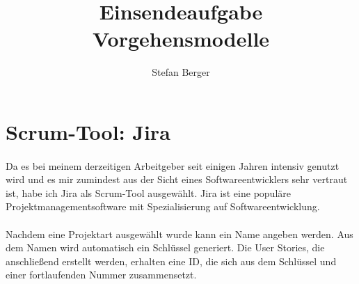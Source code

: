\documentclass{article}
\begin{document}
\title{\Large Einsendeaufgabe \\ Vorgehensmodelle}
\author{\normalsize Stefan Berger}
\date{}
\maketitle

\vspace{160px}

\pagebreak

\section{Scrum-Tool: Jira}
\paragraph{}
Da es bei meinem derzeitigen Arbeitgeber seit einigen Jahren intensiv genutzt wird und es mir zumindest aus der Sicht eines Softwareentwicklers sehr vertraut ist, habe ich Jira  als Scrum-Tool ausgewählt. Jira ist eine populäre Projektmanagementsoftware mit Spezialisierung auf Softwareentwicklung.

\begin{figure}[h]
  \centering
  \label{assistent}
\end{figure}

\paragraph{}
Nachdem eine Projektart ausgewählt wurde kann ein Name angeben werden. Aus dem Namen wird automatisch ein Schlüssel generiert. Die User Stories, die anschließend erstellt werden, erhalten eine ID, die sich aus dem Schlüssel und einer fortlaufenden Nummer zusammensetzt.
\end{document}

